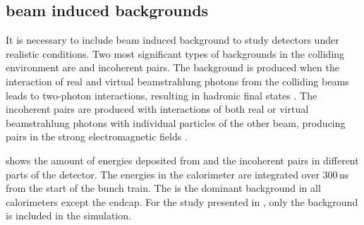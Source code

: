 
\subsection{\CLIC beam induced backgrounds}
\label{sec:pandoraggHad}

It is necessary to include beam induced background to study \CLIC detectors under realistic conditions. Two most significant types of backgrounds  \cite{Linssen:2012hp} in the \CLIC colliding environment are \ggHad and incoherent \ee pairs. The \ggHad background is produced when the interaction of real and virtual beamstrahlung photons from the colliding beams leads to two-photon interactions, resulting in  hadronic final states \cite{Drees:1991zka, Chen:1993dba}. The incoherent \ee pairs are produced with interactions of both real or virtual beamstrahlung photons with individual particles of the other beam, producing \ee pairs in the strong electromagnetic fields \cite{Chen:1992ax}.


 shows the amount of energies deposited from \ggHad and the incoherent pairs in different parts of the \CLICILD detector. The energies in the calorimeter are integrated over 300\,ns from the start of the bunch train. The \ggHad is the dominant background in all calorimeters except the \HCAL endcap. For the study presented in , only the \ggHad background is included in the simulation.


